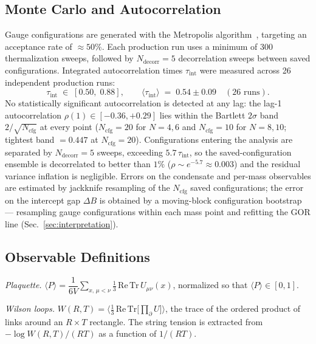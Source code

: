 \documentclass[12pt]{article}
\newcommand{\tr}{\mathrm{Tr}}
\begin{document}
\subsection{Monte Carlo and Autocorrelation}
\label{sec:montecarlo}

Gauge configurations are generated with the Metropolis
algorithm~\cite{Metropolis1953}, targeting an acceptance rate of
${\approx}50\%$.  Each production run uses a minimum of 300
thermalization sweeps, followed by $N_{\mathrm{decorr}}=5$ decorrelation
sweeps between saved configurations.  Integrated autocorrelation times
$\tau_{\mathrm{int}}$ were measured across 26 independent production runs:
\begin{equation}
  \tau_{\mathrm{int}} \;\in\; [0.50,\;0.88],
  \qquad
  \langle\tau_{\mathrm{int}}\rangle \;=\; 0.54 \pm 0.09
  \quad (26\text{ runs}).
  \label{eq:tauint}
\end{equation}
No statistically significant autocorrelation is detected at any lag:
the lag-1 autocorrelation $\rho(1)\in[-0.36,+0.29]$ lies within the
Bartlett $2\sigma$ band $2/\sqrt{N_{\mathrm{cfg}}}$ at every point
($N_{\mathrm{cfg}}=20$ for $N=4,6$ and $N_{\mathrm{cfg}}=10$ for
$N=8,10$; tightest band $=0.447$ at $N_{\mathrm{cfg}}=20$).  Configurations entering the analysis are
separated by $N_{\mathrm{decorr}}=5$ sweeps, exceeding
$5.7\,\tau_{\mathrm{int}}$, so the saved-configuration ensemble is
decorrelated to better than $1\%$ ($\rho\sim e^{-5.7}\approx0.003$)
and the residual variance inflation is negligible.  Errors on the
condensate and per-mass observables are estimated by jackknife
resampling of the $N_{\mathrm{cfg}}$ saved configurations; the error
on the intercept gap $\Delta B$ is obtained by a moving-block
configuration bootstrap --- resampling gauge configurations within each
mass point and refitting the GOR line
(Sec.~\ref{sec:interpretation}).

\subsection{Observable Definitions}
\label{sec:observables}

\noindent\textit{Plaquette.}\enspace
$\langle P\rangle = \dfrac{1}{6V}\sum_{x,\,\mu<\nu}
\tfrac{1}{3}\,\mathrm{Re}\,\tr\,U_{\mu\nu}(x)$, normalized so that
$\langle P\rangle\in[0,1]$.

\smallskip
\noindent\textit{Wilson loops.}\enspace
$W(R,T) = \bigl\langle \tfrac{1}{3}\,\mathrm{Re}\,\tr
\bigl[\textstyle\prod_{\partial} U\bigr]\bigr\rangle$, the trace of the
ordered product of links around an $R\times T$ rectangle.  The string
tension is extracted from $-\log W(R,T)/(RT)$ as a function of
$1/(RT)$.
\end{document}
